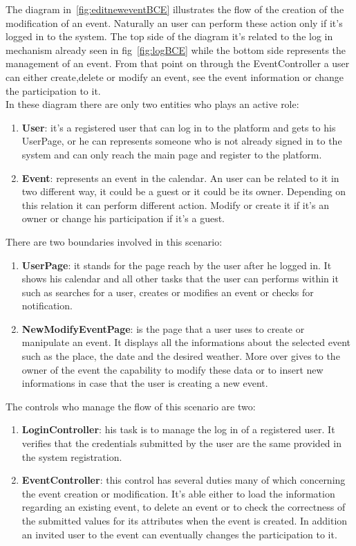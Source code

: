 The diagram in~\ref{fig:editneweventBCE} illustrates the flow of the creation of the modification of an event. Naturally an user can perform these action only if it's logged in to the system. The top side of the diagram it's related to the log in mechanism already seen in fig~\ref{fig:logBCE} while the bottom side represents the management of an event. From that point on through the EventController a user can either create,delete or modify an event, see the event information or change the participation to it.
\\In these diagram there are only two entities who plays an active role:
\begin{enumerate}
\item  {\bf User}: it's a registered user that can log in to the platform and gets to his UserPage, or he can  represents someone who is not already signed in  to the system and can only reach the main page and register to the platform.
\item  {\bf Event}: represents an event in the calendar. An user can be related to it in two different way, it could be a guest or it could be its owner. Depending on this relation it can perform different action. Modify or create it if it's an owner or change his participation if it's a guest.
\end{enumerate}
There are two boundaries involved in this scenario: \begin{enumerate}
\item  {\bf UserPage}: it stands for the page reach by the user after he logged in. It shows his calendar and all other tasks that the user can performs within it such as searches for a user, creates or modifies an event or checks for notification.
\item {\bf NewModifyEventPage}: is the page that a user uses to create or manipulate an event. It displays all the informations about the selected event such as the place, the date and the desired weather. More over gives to the owner of the event the capability to modify these data or to insert new informations in case that the user is creating a new event.
 \end{enumerate}
The controls who manage the flow of this scenario are two:\begin{enumerate}
\item {\bf LoginController}: his task is to manage the log in of a registered user. It verifies that the credentials submitted by the user are the same provided in the system registration.   
\item {\bf EventController}: this control has several duties many of which concerning the event creation or modification. It's able either to load the information regarding an existing event, to delete an event or to check the correctness of the submitted values for its attributes when the event is created. In addition an invited user to the event can eventually changes the participation to it.
\end{enumerate}

